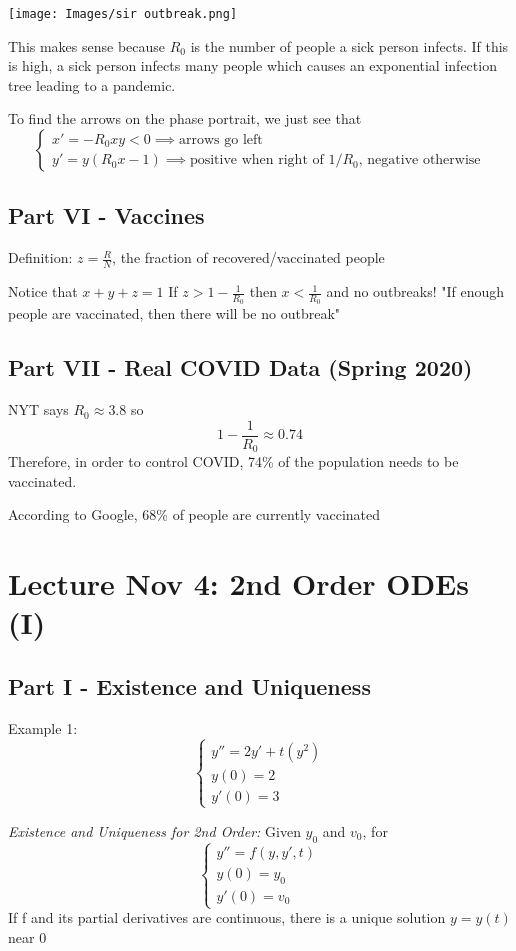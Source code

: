 \documentclass[12pt]{article}
\begin{document}
\texttt{[image: Images/sir outbreak.png]}

This makes sense because $R_0$ is the number of people a sick person infects. If this is high, a sick person infects many people which causes an exponential infection tree leading to a pandemic.

To find the arrows on the phase portrait, we just see that
\[\begin{cases}
    x' = -R_0 xy < 0 \implies  \text{arrows go left}\\
    y' = y(R_0 x - 1) \implies \text{positive when right of $1/R_0$, negative otherwise}
\end{cases}\]

\subsection*{Part VI - Vaccines}
Definition: $z = \frac{R}{N}$,  the fraction of recovered/vaccinated people 

Notice that $x + y + z = 1$ 
If $z > 1 - \frac{1}{R_0}$ then $x < \frac{1}{R_0}$ and no outbreaks!
"If enough people are vaccinated, then there will be no outbreak"

\subsection*{Part VII - Real COVID Data (Spring 2020)}
NYT says $R_0 \approx 3.8$ 
so 
\[1 - \frac{1}{R_0} \approx 0.74\]
Therefore, in order to control COVID, 74\% of the population needs to be vaccinated. 

According to Google, 68\% of people are currently vaccinated

\section{Lecture Nov 4: 2nd Order ODEs (I)}
\subsection*{Part I - Existence and Uniqueness}
Example 1:
\[\begin{cases}
    y'' = 2y' + t(y^2)\\
    y(0) = 2\\
    y'(0) = 3
\end{cases}\]

\emph{Existence and Uniqueness for 2nd Order:} Given $y_0$ and $v_0$, for 
\[\begin{cases}
    y'' = f(y, y', t)\\
    y(0) = y_0\\
    y'(0) = v_0
\end{cases}\]
If f and its partial derivatives are continuous, there is a unique solution $y = y(t)$ near 0
\end{document}
